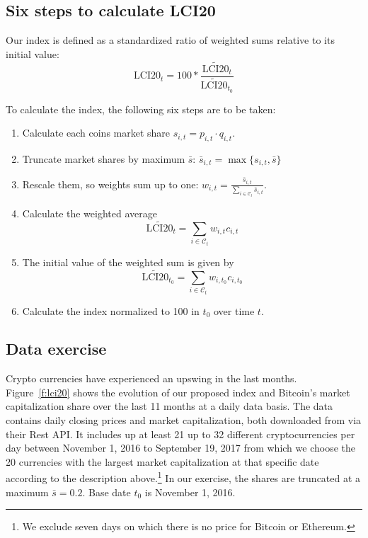 \documentclass[11pt]{article}
\begin{document}
\subsection{Six steps to calculate LCI20}

Our index is defined as a standardized ratio of weighted sums relative to its initial value:
\begin{equation}
  \text{LCI20}_t = 100 * \frac{\widetilde{\text{LCI20}}_t}{\widetilde{\text{LCI20}}_{t_0}}
\end{equation}

\noindent To calculate the index, the following six steps are to be taken:
\begin{enumerate}
  \item Calculate each coins market share $s_{i,t} = p_{i,t} \cdot q_{i,t}$.
  \item Truncate market shares by maximum $\bar s$: $\bar s_{i,t} = \max\{ s_{i,t}, \bar s\}$
  \item Rescale them, so weights sum up to one: $w_{i,t} = \frac{\bar s_{i,t}}{\sum_{i \in \mathcal{C}_t} \bar s_{i,t}}$. %
  \item Calculate the weighted average $$\widetilde{\text{LCI20}}_t = \sum_{i \in \mathcal{C}_{t}} w_{i,t} c_{i,t}$$
  \item The initial value of the weighted sum is given by $$\widetilde{\text{LCI20}}_{t_0} = \sum_{i \in \mathcal{C}_{t}} w_{i,t_0} c_{i,t_0}$$
  \item Calculate the index normalized to 100 in $t_0$ over time $t$. %
\end{enumerate}


\subsection{Data exercise}

Crypto currencies have experienced an upswing in the last months.
Figure~\ref{f:lci20} shows the evolution of our proposed index and Bitcoin's market capitalization share over the last 11 months at a daily data basis.
The data contains daily closing prices and market capitalization, both downloaded from \citeauthor{CoinCap} via their Rest API.
It includes up at least 21 up to 32 different cryptocurrencies per day between November 1, 2016 to September 19, 2017 from which we choose the 20 currencies with the largest market capitalization at that specific date according to the description above.\footnote{We exclude seven days on which there is no price for Bitcoin or Ethereum.}
In our exercise, the shares are truncated at a maximum $\bar s = 0.2$.
Base date $t_0$ is November 1, 2016.
\end{document}
